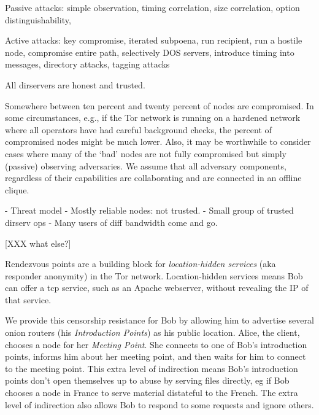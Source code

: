 \documentclass[times,10pt,twocolumn]{article}
\begin{document}
Passive attacks:
simple observation,
timing correlation,
size correlation,
option distinguishability,

Active attacks:
key compromise,
iterated subpoena,
run recipient,
run a hostile node,
compromise entire path,
selectively DOS servers,
introduce timing into messages,
directory attacks,
tagging attacks



All dirservers are honest and trusted.

Somewhere between ten percent and twenty percent of nodes
are compromised. In some circumstances, e.g., if the Tor network
is running on a hardened network where all operators have had careful
background checks, the percent of compromised nodes might be much
lower. Also, it may be worthwhile to consider cases where many
of the `bad' nodes are not fully compromised but simply (passive)
observing adversaries. We assume that all adversary components,
regardless of their capabilities are collaborating and are connected
in an offline clique.


- Threat model
- Mostly reliable nodes: not trusted.
- Small group of trusted dirserv ops
- Many users of diff bandwidth come and go.

[XXX what else?]



\label{sec:design}



\label{subsec:exitpolicies}

\label{subsec:dir-servers}

\label{sec:rendezvous}

Rendezvous points are a building block for \emph{location-hidden services}
(aka responder anonymity) in the Tor network. Location-hidden
services means Bob can offer a tcp service, such as an Apache webserver,
without revealing the IP of that service.

We provide this censorship resistance for Bob by allowing him to
advertise several onion routers (his \emph{Introduction Points}) as his
public location. Alice, the client, chooses a node for her \emph{Meeting
Point}. She connects to one of Bob's introduction points, informs him
about her meeting point, and then waits for him to connect to the meeting
point. This extra level of indirection means Bob's introduction points
don't open themselves up to abuse by serving files directly, eg if Bob
chooses a node in France to serve material distateful to the French. The
extra level of indirection also allows Bob to respond to some requests
and ignore others.
\end{document}

